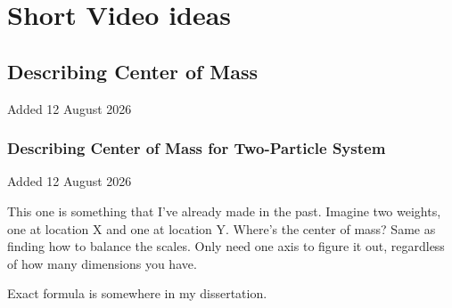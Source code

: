 \section{Short Video ideas}
\subsection{Describing Center of Mass}
Added 12 August 2026

\subsubsection{Describing Center of Mass for Two-Particle System}
Added 12 August 2026


This one is something that I've already made in the past. Imagine two weights, one at location X and one at location Y. 
Where's the center of mass?
Same as finding how to balance the scales.
Only need one axis to figure it out, regardless of how many dimensions you have.

Exact formula is somewhere in my dissertation.